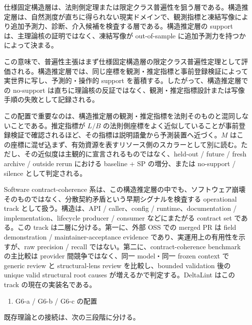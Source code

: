 \documentclass[12pt,a4paper]{article}
\begin{document}
仕様固定構造層は、法則側定理または限定クラス普遍性を狙う層である。構造推定層は、自然測度が直ちに得られない現実ドメインで、観測指標と凍結写像により追加予測力、診断、介入候補を検査する層である。構造推定層の support は、主理論核の証明ではなく、凍結写像が out-of-sample に追加予測力を持つかによって決まる。

この意味で、普遍性主張はまず仕様固定構造層の限定クラス普遍性定理として評価される。構造推定層では、同じ座標を観測・推定指標と事前登録検証によって実世界に写し、予測的・操作的 support を蓄積する。したがって、構造推定層での no-support は直ちに理論核の反証ではなく、観測・推定指標設計または写像手順の失敗として記録される。

この配置で重要なのは、構造推定層の観測・推定指標を法則そのものと混同しないことである。推定指標が \(L/B\) の法則側座標をよく近似していることが事前登録検証で確認されるほど、その指標は説明語彙から予測装置へ近づく。\(M\) はこの座標に混ぜ込まず、有効資源を表すリソース側のスカラーとして別に読む。ただし、その近似度は主観的に宣言されるものではなく、held-out / future / fresh archive / outside rerun における baseline + SP の増分、または no-support / silence として判定される。

Software contract-coherence 系は、この構造推定層の中でも、ソフトウェア崩壊そのものではなく、分散契約矛盾という早期シグナルを検査する operational track として扱う。構造は、API / caller、config / runtime、documentation / implementation、lifecycle producer / consumer などにまたがる contract set である。この track は二層に分ける。第一に、外部 OSS での merged PR は field demonstration / maintainer-acceptance evidence であり、実運用上の有用性を示すが、raw precision / recall ではない。第二に、contract-coherence benchmark の主比較は provider 間競争ではなく、同一 model・同一 frozen context で generic review と structural-lens review を比較し、bounded validation 後の unique valid structural root causes が増えるかで判定する。DeltaLint はこの track の現在の実装名である。

\begin{enumerate}
\def\labelenumi{\arabic{enumi}.}
\setcounter{enumi}{6}
\tightlist
\item
  G6-a / G6-b / G6-c の配置
\end{enumerate}

既存理論との接続は、次の三段階に分ける。
\end{document}
